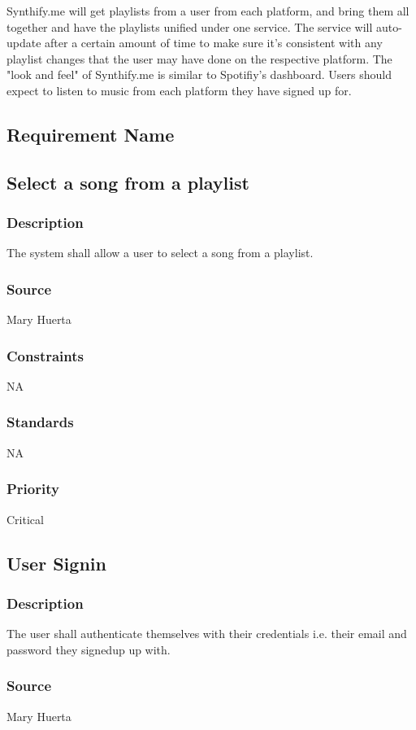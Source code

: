 Synthify.me will get playlists from a user from each platform, and bring them all together and have the playlists unified under one service. The service will auto-update after a certain amount of time to make sure it's consistent with any playlist changes that the user may have done on the respective platform. The "look and feel" of Synthify.me is similar to Spotifiy's dashboard. Users should expect to listen to music from each platform they have signed up for.

\subsection{Requirement Name}

\subsection{Select a song from a playlist}
\subsubsection{Description}
The system shall allow a user to select a song from a playlist.
\subsubsection{Source}
Mary Huerta
\subsubsection{Constraints}
NA
\subsubsection{Standards}
NA
\subsubsection{Priority}
Critical


\subsection{User Signin}
\subsubsection{Description}
The user shall authenticate themselves with their credentials i.e. their email and password they signedup up with.
\subsubsection{Source}
Mary Huerta

